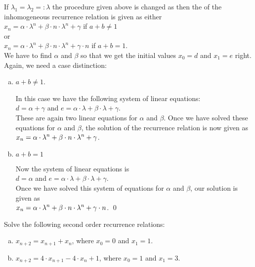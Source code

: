 If $\lambda_1 = \lambda_2 =: \lambda$  the procedure given above is changed as then the  of
the inhomogeneous recurrence relation is given as either
\\[0.2cm]
\hspace*{1.3cm}
$x_n = \alpha \cdot \lambda^n + \beta \cdot n \cdot \lambda^n + \gamma$ \quad if $a + b \not= 1$
\\[0.2cm]
or
\\[0.2cm]
\hspace*{1.3cm}
$x_n = \alpha \cdot \lambda^n + \beta \cdot n \cdot \lambda^n + \gamma \cdot n$ \quad if $a + b = 1$.
\\[0.2cm]
We have to find $\alpha$ and $\beta$ so that we get the initial values $x_0 = d$ and $x_1 = e$ right.
Again, we need a case distinction:
\begin{enumerate}[(a)]
\item $a + b \not = 1$.

      In this case we have the following system of linear equations:
      \\[0.2cm]
      \hspace*{1.3cm}
      $d = \alpha + \gamma$ \quad and \quad $e = \alpha \cdot \lambda + \beta \cdot \lambda + \gamma$.
      \\[0.2cm]
      These are again two linear equations for $\alpha$ and $\beta$.  
      Once we have solved these equations for $\alpha$ and
      $\beta$, the solution of the recurrence relation is now given as
      \\[0.2cm]
      \hspace*{1.3cm}
      $\displaystyle x_{n} = \alpha \cdot \lambda^n + \beta \cdot n \cdot \lambda^n + \gamma$.
\item $a + b = 1$
    
      Now the system of linear equations is 
      \\[0.2cm]
      \hspace*{1.3cm}
      $d = \alpha$ \quad and \quad $e = \alpha \cdot \lambda + \beta \cdot \lambda + \gamma$. 
      \\[0.2cm]
      Once we have solved this system of equations for $\alpha$ and $\beta$, our solution is given as
      \\[0.2cm]
      \hspace*{1.3cm}
      $\displaystyle x_{n} = \alpha \cdot \lambda^n + \beta \cdot n \cdot \lambda^n + \gamma \cdot n$. \qed
\end{enumerate}

\exercise
Solve the following second order recurrence relations:
\begin{enumerate}[(a)]
\item $x_{n+2} = x_{n+1} + x_n$, \quad where $x_0 = 0$ and $x_1 = 1$.  
\item $x_{n+2} = 4 \cdot x_{n+1} - 4 \cdot x_n + 1$, \quad where $x_0 = 1$ and $x_1 = 3$.  \eox
\end{enumerate}


